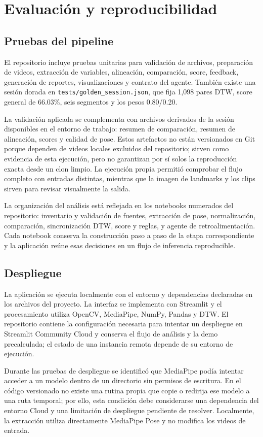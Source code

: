 \documentclass[12pt,a4paper]{article}
\begin{document}
\section{Evaluación y reproducibilidad}
\subsection{Pruebas del pipeline}
El repositorio incluye pruebas unitarias para validación de archivos, preparación de videos, extracción de variables, alineación, comparación, score, feedback, generación de reportes, visualizaciones y contrato del agente. También existe una sesión dorada en \texttt{tests/golden\_session.json}, que fija 1,098 pares DTW, score general de 66.03\%, seis segmentos y los pesos 0.80/0.20.

La validación aplicada se complementa con archivos derivados de la sesión disponibles en el entorno de trabajo: resumen de comparación, resumen de alineación, scores y calidad de pose. Estos artefactos no están versionados en Git porque dependen de videos locales excluidos del repositorio; sirven como evidencia de esta ejecución, pero no garantizan por sí solos la reproducción exacta desde un clon limpio. La ejecución propia permitió comprobar el flujo completo con entradas distintas, mientras que la imagen de landmarks y los clips sirven para revisar visualmente la salida.

La organización del análisis está reflejada en los notebooks numerados del repositorio: inventario y validación de fuentes, extracción de pose, normalización, comparación, sincronización DTW, score y reglas, y agente de retroalimentación. Cada notebook conserva la construcción paso a paso de la etapa correspondiente y la aplicación reúne esas decisiones en un flujo de inferencia reproducible.
\subsection{Despliegue}
La aplicación se ejecuta localmente con el entorno y dependencias declaradas en los archivos del proyecto. La interfaz se implementa con Streamlit y el procesamiento utiliza OpenCV, MediaPipe, NumPy, Pandas y DTW. El repositorio contiene la configuración necesaria para intentar un despliegue en Streamlit Community Cloud y conserva el flujo de análisis y la demo precalculada; el estado de una instancia remota depende de su entorno de ejecución.

Durante las pruebas de despliegue se identificó que MediaPipe podía intentar acceder a un modelo dentro de un directorio sin permisos de escritura. En el código versionado no existe una rutina propia que copie o redirija ese modelo a una ruta temporal; por ello, esta condición debe considerarse una dependencia del entorno Cloud y una limitación de despliegue pendiente de resolver. Localmente, la extracción utiliza directamente MediaPipe Pose y no modifica los videos de entrada.
\end{document}

